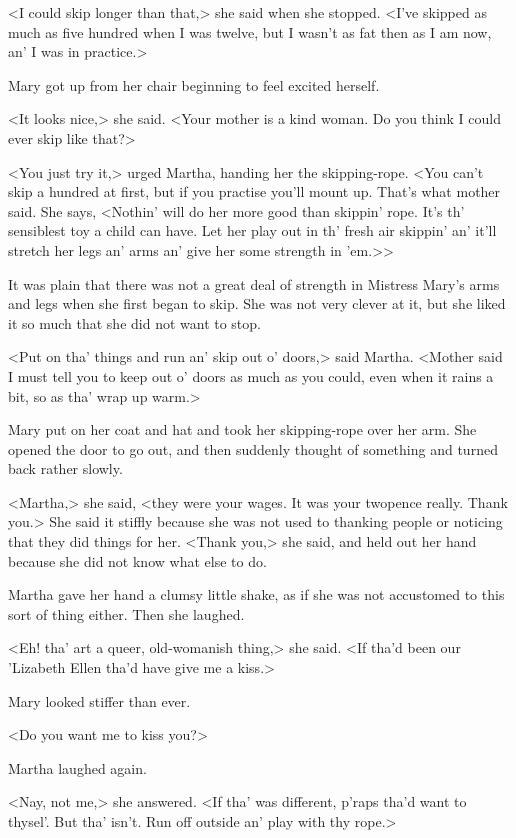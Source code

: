 <I could skip longer than that,> she said when she stopped. <I've skipped as much as five hundred when I was twelve, but I wasn't as fat then as I am now, an' I was in practice.>

Mary got up from her chair beginning to feel excited herself.

<It looks nice,> she said. <Your mother is a kind woman. Do you think I could ever skip like that?>

<You just try it,> urged Martha, handing her the skipping-rope. <You can't skip a hundred at first, but if you practise you'll mount up. That's what mother said. She says, <Nothin' will do her more good than skippin' rope. It's th' sensiblest toy a child can have. Let her play out in th' fresh air skippin' an' it'll stretch her legs an' arms an' give her some strength in 'em.>>

It was plain that there was not a great deal of strength in Mistress Mary's arms and legs when she first began to skip. She was not very clever at it, but she liked it so much that she did not want to stop.

<Put on tha' things and run an' skip out o' doors,> said Martha. <Mother said I must tell you to keep out o' doors as much as you could, even when it rains a bit, so as tha' wrap up warm.>

Mary put on her coat and hat and took her skipping-rope over her arm. She opened the door to go out, and then suddenly thought of something and turned back rather slowly.

<Martha,> she said, <they were your wages. It was your twopence really. Thank you.> She said it stiffly because she was not used to thanking people or noticing that they did things for her. <Thank you,> she said, and held out her hand because she did not know what else to do.

Martha gave her hand a clumsy little shake, as if she was not accustomed to this sort of thing either. Then she laughed.

<Eh! tha' art a queer, old-womanish thing,> she said. <If tha'd been our 'Lizabeth Ellen tha'd have give me a kiss.>

Mary looked stiffer than ever.

<Do you want me to kiss you?>

Martha laughed again.

<Nay, not me,> she answered. <If tha' was different, p'raps tha'd want to thysel'. But tha' isn't. Run off outside an' play with thy rope.>

